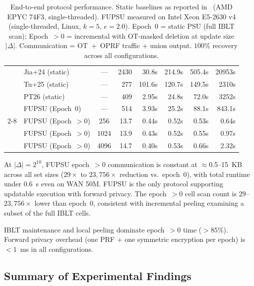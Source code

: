 \begin{table}[ht]
\begin{tabular}{|c|l|c|r|r|r|r|r|}
& Jia+24 (static)    & --- & 2430  & 30.8s  & 214.9s & 505.4s & 20953s \\
& Tu+25 (static)     & --- & 277   & 101.6s & 120.7s & 149.5s & 2310s \\
& PT26 (static)      & --- & 409   & 2.95s  & 24.8s  & 72.0s  & 3252s \\
& FUPSU (Epoch~0)    & --- & 514   & 3.93s  & 25.2s  & 88.1s  & 843.1s \\
\cline{2-8}
& FUPSU (Epoch~$>$0) & 256  & 13.7  & 0.44s  & 0.52s  & 0.53s  & 0.64s \\
& FUPSU (Epoch~$>$0) & 1024 & 13.9  & 0.43s  & 0.52s  & 0.55s  & 0.97s \\
& FUPSU (Epoch~$>$0) & 4096 & 14.7  & 0.40s  & 0.53s  & 0.66s  & 2.32s \\
\hline
\end{tabular}
\caption{End-to-end protocol performance. Static baselines as reported
in~\cite{PT26} (AMD EPYC 74F3, single-threaded). FUPSU measured on Intel
Xeon E5-2630 v4 (single-threaded, Linux, $k{=}5$, $e{=}2.0$). Epoch~0 =
static PSU (full IBLT scan); Epoch~$>$0 = incremental with OT-masked
deletion at update size $|\Delta|$. Communication = OT~+~OPRF traffic +
union output. $100\%$ recovery across all configurations.}
\label{tab:main-perf}
\end{table}

\smallskip\noindent
At $|\Delta| = 2^{10}$, FUPSU epoch~$>$0 communication is constant at
$\approx$0.5--15~KB across all set sizes ($29\times$ to $23{,}756\times$ reduction
vs.\ epoch~0), with total runtime under $0.6$~s even on WAN 50M.
FUPSU is the only protocol supporting updatable execution with forward
privacy. The epoch~$>$0 cell scan count is $29$--$23{,}756\times$ lower
than epoch~0, consistent with incremental peeling examining a subset
of the full IBLT cells.

IBLT maintenance and local peeling dominate epoch~$>$0 time ($>85\%$).
Forward privacy overhead (one PRF + one symmetric encryption per epoch) is $<1$~ms
in all configurations.

\subsection{Summary of Experimental Findings}

